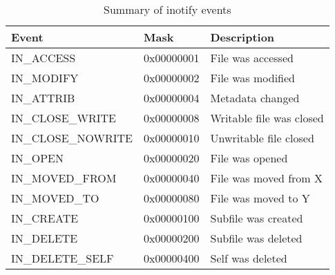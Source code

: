 \begin{table}
    \centering
    \begin{tabular}{ l l l }
        \toprule
        Event               & Mask          & Description
        \\ \midrule
        IN\_ACCESS          & 0x00000001    & File was accessed
        \\
        IN\_MODIFY          & 0x00000002    & File was modified
        \\
        IN\_ATTRIB          & 0x00000004    & Metadata changed
        \\
        IN\_CLOSE\_WRITE    & 0x00000008    & Writable file was closed
        \\
        IN\_CLOSE\_NOWRITE  & 0x00000010    & Unwritable file closed
        \\
        IN\_OPEN            & 0x00000020    & File was opened
        \\
        IN\_MOVED\_FROM     & 0x00000040    & File was moved from X
        \\
        IN\_MOVED\_TO       & 0x00000080    & File was moved to Y
        \\
        IN\_CREATE          & 0x00000100    & Subfile was created
        \\
        IN\_DELETE          & 0x00000200    & Subfile was deleted
        \\
        IN\_DELETE\_SELF    & 0x00000400    & Self was deleted
        \\
        \bottomrule
    \end{tabular}
    \caption{Summary of inotify events \cite{love2005}}
    \label{tab:inotify-events}
\end{table}
